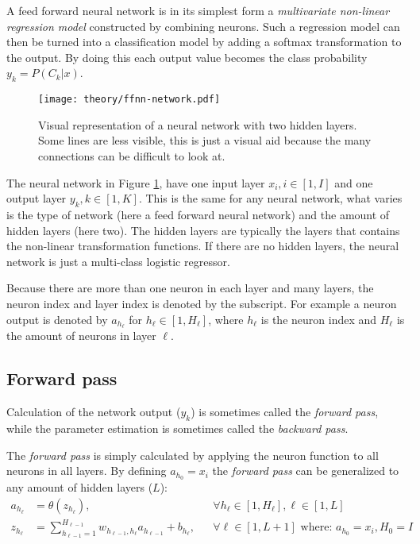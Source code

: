 A feed forward neural network is in its simplest form a \textit{multivariate non-linear regression model} constructed by combining neurons. Such a regression model can then be turned into a classification model by adding a softmax transformation \cite{the-elements-of-statistical-learning} to the output. By doing this each output value becomes the class probability $y_k = P(C_k | x)$.

\begin{figure}[h]
	\centering
	\texttt{[image: theory/ffnn-network.pdf]}
	\caption{Visual representation of a neural network with two hidden layers. Some lines are less visible, this is just a visual aid because the many connections can be difficult to look at.}
	\label{fig:theory:ffnn:network}
\end{figure}

The neural network in Figure \ref{fig:theory:ffnn:network}, have one input layer $x_i, i \in [1, I]$ and one output layer $y_k, k \in [1, K]$. This is the same for any neural network, what varies is the type of network (here a feed forward neural network) and the amount of hidden layers (here two). The hidden layers are typically the layers that contains the non-linear transformation functions. If there are no hidden layers, the neural network is just a multi-class logistic regressor\cite{bishop}.

Because there are more than one neuron in each layer and many layers, the neuron index and layer index is denoted by the subscript. For example a neuron output is denoted by $a_{h_{\ell}}$ for $h_{\ell} \in [1, H_{\ell}]$, where $h_{\ell}$ is the neuron index and $H_\ell$ is the amount of neurons in layer $\ell$.

\subsection{Forward pass}

Calculation of the network output ($y_k$) is sometimes called the \textit{forward pass}, while the parameter estimation is sometimes called the \textit{backward pass}.

The \textit{forward pass} is simply calculated by applying the neuron function to all neurons in all layers. By defining $a_{h_0} = x_i$ the \textit{forward pass} can be generalized to any amount of hidden layers ($L$):
\begin{equation}
\begin{aligned}
a_{h_\ell} &= \theta(z_{h_\ell}), && \forall h_{\ell} \in [1, H_{\ell}], \ell \in [1, L] \\
z_{h_\ell} &= \sum_{h_{\ell-1} = 1}^{H_{\ell-1}} w_{h_{\ell-1}, h_{\ell}} a_{h_{\ell-1}} + b_{h_{\ell}}, && \forall \ell \in [1, L+1] \text{ where: } a_{h_0} = x_i, H_0 = I \\
\end{aligned}
\end{equation}

